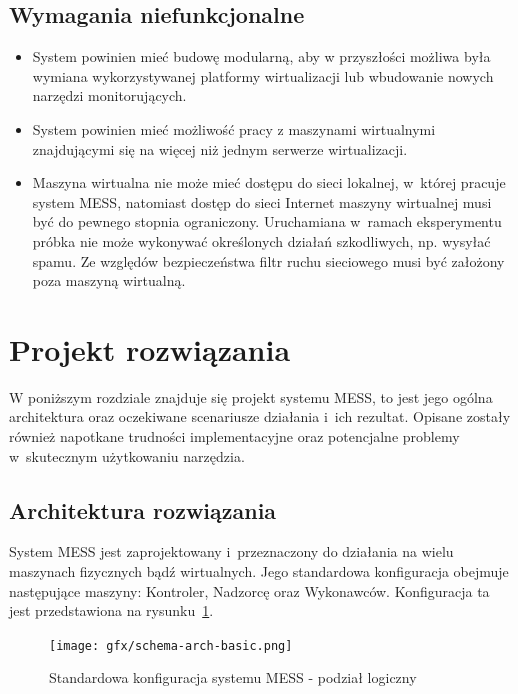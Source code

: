 \documentclass[a4paper,12pt,oneside]{article}
\begin{document}
	\subsection{Wymagania niefunkcjonalne}
	\begin{itemize}
		\item System powinien mieć budowę modularną, aby w przyszłości możliwa była wymiana wykorzystywanej platformy wirtualizacji lub wbudowanie nowych narzędzi monitorujących.
		\item System powinien mieć możliwość pracy z maszynami wirtualnymi znajdującymi się na więcej niż jednym serwerze wirtualizacji.
		\item Maszyna wirtualna nie może mieć dostępu do sieci lokalnej, w~której pracuje system MESS, natomiast dostęp do sieci Internet maszyny wirtualnej musi być do pewnego stopnia ograniczony. Uruchamiana w~ramach eksperymentu próbka nie może wykonywać określonych działań szkodliwych, np. wysyłać spamu. Ze względów bezpieczeństwa filtr ruchu sieciowego musi być założony poza maszyną wirtualną.
	\end{itemize}
			
	\clearpage
	\newpage
	
	\section{Projekt rozwiązania}
			
	W poniższym rozdziale znajduje się projekt systemu MESS, to jest jego ogólna architektura oraz oczekiwane scenariusze działania i~ich rezultat. Opisane zostały również napotkane trudności implementacyjne oraz potencjalne problemy w~skutecznym użytkowaniu narzędzia.
			
	\subsection{Architektura rozwiązania}
	
	System MESS jest zaprojektowany i~przeznaczony do działania na wielu maszynach fizycznych bądź wirtualnych. Jego standardowa konfiguracja obejmuje następujące maszyny: Kontroler, Nadzorcę oraz Wykonawców. Konfiguracja ta jest przedstawiona na rysunku~\ref{gfx--schema-basic-logical}.
	
	\begin{figure}[h!]
		\texttt{[image: gfx/schema-arch-basic.png]}
		\caption{Standardowa konfiguracja systemu MESS - podział logiczny}
		\label{gfx--schema-basic-logical}
	\end{figure}			
	
\end{document}
